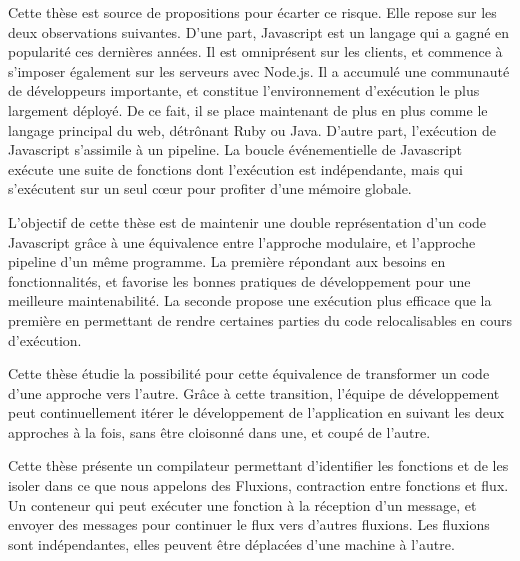 Cette thèse est source de propositions pour écarter ce risque.
Elle repose sur les deux observations suivantes.
D'une part, Javascript est un langage qui a gagné en popularité ces dernières années.
Il est omniprésent sur les clients, et commence à s'imposer également sur les serveurs avec Node.js.
Il a accumulé une communauté de développeurs importante, et constitue l'environnement d’exécution le plus largement déployé.
De ce fait, il se place maintenant de plus en plus comme le langage principal du web, détrônant Ruby ou Java.
D'autre part, l'exécution de Javascript s'assimile à un pipeline.
La boucle événementielle de Javascript exécute une suite de fonctions dont l’exécution est indépendante, mais qui s’exécutent sur un seul cœur pour profiter d'une mémoire globale.

L'objectif de cette thèse est de maintenir une double représentation d'un code Javascript grâce à une équivalence entre l'approche modulaire, et l'approche pipeline d'un même programme.
La première répondant aux besoins en fonctionnalités, et favorise les bonnes pratiques de développement pour une meilleure maintenabilité.
La seconde propose une exécution plus efficace que la première en permettant de rendre certaines parties du code relocalisables en cours d’exécution.

Cette thèse étudie la possibilité pour cette équivalence de transformer un code d'une approche vers l'autre.
Grâce à cette transition, l'équipe de développement peut continuellement itérer le développement de l'application en suivant les deux approches à la fois, sans être cloisonné dans une, et coupé de l'autre.

Cette thèse présente un compilateur permettant d'identifier les fonctions et de les isoler dans ce que nous appelons des Fluxions, contraction entre fonctions et flux.
Un conteneur qui peut exécuter une fonction à la réception d'un message, et envoyer des messages pour continuer le flux vers d'autres fluxions.
Les fluxions sont indépendantes, elles peuvent être déplacées d'une machine à l'autre.

